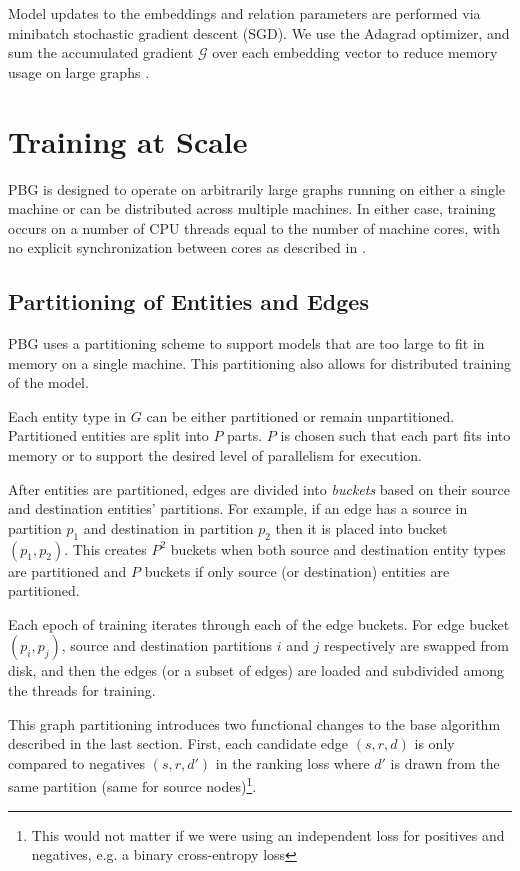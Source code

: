 \documentclass{article}
\begin{document}
Model updates to the embeddings and relation parameters are performed via minibatch stochastic gradient descent (SGD). We use the Adagrad optimizer, and sum the accumulated gradient $\mathcal{G}$ over each embedding vector to reduce memory usage on large graphs \cite{adagrad}.


\section{Training at Scale}
\label{sec:large-scale}

PBG is designed to operate on arbitrarily large graphs running on either a single machine or can be distributed across multiple machines. In either case, training occurs on a number of CPU threads equal to the number of machine cores, with no explicit synchronization between cores as described in \cite{hogwild}. 



\subsection{Partitioning of Entities and Edges}
\label{sec:partition}
PBG uses a partitioning scheme to support models that are too large to fit in memory on a single machine. This partitioning also allows for distributed training of the model. 

Each entity type in $G$ can be either partitioned or remain unpartitioned. Partitioned entities are split into $P$ parts. $P$ is chosen such that each part fits into memory or to support the desired level of parallelism for execution.

After entities are partitioned, edges are divided into \textit{buckets} based on their source and destination entities' partitions. For example, if an edge has a source in partition $p_1$ and destination in partition $p_2$ then it is placed into bucket $(p_1, p_2).$ This creates $P^2$ buckets when both source and destination entity types are partitioned and $P$ buckets if only source (or destination) entities are partitioned.

Each epoch of training iterates through each of the edge buckets. For edge bucket $(p_i, p_j)$, source and destination partitions $i$ and $j$ respectively are swapped from disk, and then the edges (or a subset of edges) are loaded and subdivided among the threads for training.

This graph partitioning introduces two functional changes to the base algorithm described in the last section. First, each candidate edge $(s,r,d)$ is only compared to negatives $(s,r,d')$ in the ranking loss where $d'$ is drawn from the same partition (same for source nodes)\footnote{This would not matter if we were using an independent loss for positives and negatives, e.g. a binary cross-entropy loss}. 
\end{document}
